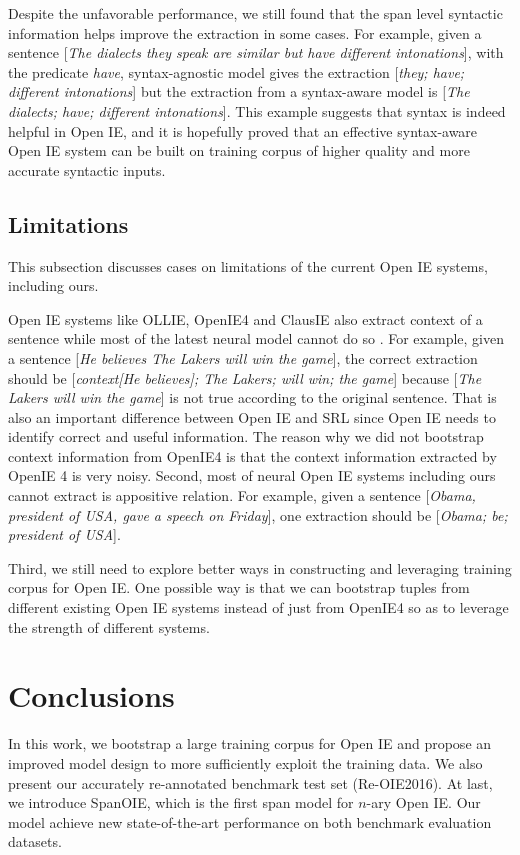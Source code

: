 \documentclass[letterpaper]{article} \usepackage{aaai20}  \usepackage{times}  \usepackage{helvet} \usepackage{courier}  \usepackage[hyphens]{url}  \urlstyle{rm} \def\UrlFont{\rm}  \usepackage{graphicx}  \frenchspacing  \setlength{\pdfpagewidth}{8.5in}  \setlength{\pdfpageheight}{11in}
\begin{document}
Despite the unfavorable performance, we still found that the span level syntactic information helps improve the extraction in some cases. For example, given a sentence [\emph{The dialects they speak are similar but have different intonations}], with the predicate \emph{have}, syntax-agnostic model gives the extraction [\emph{they; have; different intonations}] but the extraction from a syntax-aware model is [\emph{The dialects; have; different intonations}]. This example suggests that syntax is indeed helpful in Open IE, and it is hopefully proved that an effective syntax-aware Open IE system can be built on training corpus of higher quality and more accurate syntactic inputs.

\subsection{Limitations}
This subsection discusses cases on limitations of the current Open IE systems, including ours.

Open IE systems like OLLIE, OpenIE4 and ClausIE also extract context of a sentence while most of the latest neural model cannot do so
. For example, given a sentence [\emph{He believes The Lakers will win the game}], the correct extraction should be [\emph{context[He believes]; The Lakers; will win; the game}] because [\emph{The Lakers will win the game}] is not true according to the original sentence. That is also an important difference between Open IE and SRL since Open IE needs to identify correct and useful information. The reason why we did not bootstrap context information from OpenIE4 is that the context information extracted by OpenIE 4 is very noisy. Second, most of neural Open IE systems including ours cannot extract is appositive relation. For example, given a sentence [\emph{Obama, president of USA, gave a speech on Friday}], one extraction should be [\emph{Obama; be; president of USA}].

Third, we still need to explore better ways in constructing and leveraging training corpus for Open IE. One possible way is that we can bootstrap tuples from different existing Open IE systems instead of just from OpenIE4 so as to leverage the strength of different systems.

\section{Conclusions}
In this work, we bootstrap a large training corpus for Open IE and propose an improved model design to more sufficiently exploit the training data. We also present our accurately re-annotated benchmark test set (Re-OIE2016). At last, we introduce SpanOIE, which is the first span model for $n$-ary Open IE. Our model achieve new state-of-the-art performance on both benchmark evaluation datasets.



\end{document}
